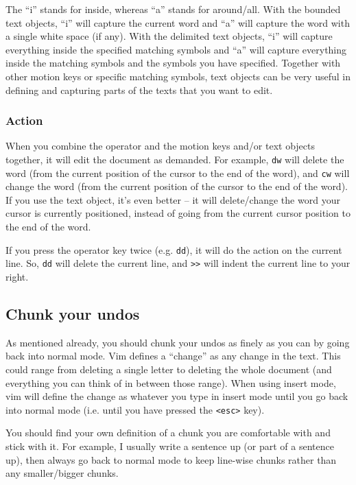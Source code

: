 The ``i'' stands for inside, whereas ``a'' stands for around/all.
With the bounded text objects, ``i'' will capture the current word and ``a'' will capture the word with a single white space (if any).
With the delimited text objects, ``i'' will capture everything inside the specified matching symbols and ``a'' will capture everything inside the matching symbols and the symbols you have specified.
Together with other motion keys or specific matching symbols, text objects can be very useful in defining and capturing parts of the texts that you want to edit.

\subsubsection{Action}

When you combine the operator and the motion keys and/or text objects together, it will edit the document as demanded.
For example, \verb|dw| will delete the word (from the current position of the cursor to the end of the word), and \verb|cw| will change the word (from the current position of the cursor to the end of the word).
If you use the text object, it's even better -- it will delete/change the word your cursor is currently positioned, instead of going from the current cursor position to the end of the word.

If you press the operator key twice (e.g. \verb|dd|), it will do the action on the current line.
So, \verb|dd| will delete the current line, and \verb|>>| will indent the current line to your right.

\subsection{Chunk your undos}

As mentioned already, you should chunk your undos as finely as you can by going back into normal mode.
Vim defines a ``change'' as any change in the text.
This could range from deleting a single letter to deleting the whole document (and everything you can think of in between those range).
When using insert mode, vim will define the change as whatever you type in insert mode until you go back into normal mode (i.e. until you have pressed the \verb|<esc>| key).

You should find your own definition of a chunk you are comfortable with and stick with it.
For example, I usually write a sentence up (or part of a sentence up), then always go back to normal mode to keep line-wise chunks rather than any smaller/bigger chunks.

